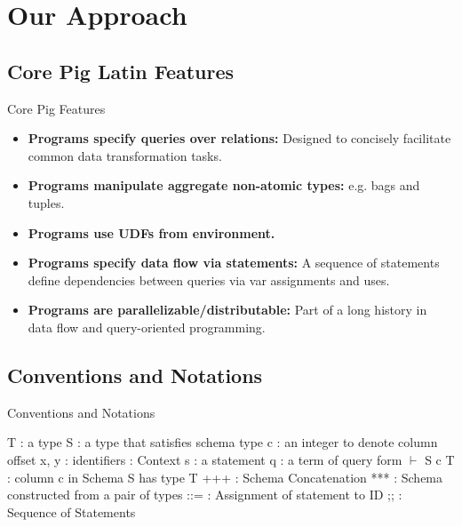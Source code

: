 \section{Our Approach}

\subsection{Core Pig Latin Features}
\begin{frame}{Core Pig Features}
\begin{itemize}
	\item \textbf{Programs specify queries over relations:} Designed to
	concisely facilitate common data transformation tasks.
	\item \textbf{Programs manipulate aggregate non-atomic types:} e.g. bags
	and tuples.
	\item \textbf{Programs use UDFs from environment.}
	\item \textbf{Programs specify data flow via statements:} A sequence of
	statements define dependencies between queries via var assignments and uses.
	\item \textbf{Programs are parallelizable/distributable:} Part of a long
	history in data flow and query-oriented programming.
\end{itemize}
\end{frame}

\subsection{Conventions and Notations}
\begin{frame}{Conventions and Notations}
\centering
	\begin{flushleft}
		T \quad : a type\newline
		S \quad : a type that satisfies schema type\newline
		c \quad : an integer to denote column offset\newline
		x, y : identifiers\newline
		\textGamma \quad : Context\newline
 		s \quad : a statement\newline
 		q \quad : a term of query form\newline
 		$\vdash$ S c T : column c in Schema S has type T\newline
 		+++ : Schema Concatenation\newline
 		*** : Schema constructed from a pair of types\newline
 		::= : Assignment of statement to ID \newline
 		;; : Sequence of Statements
	\end{flushleft}
\end{frame}

